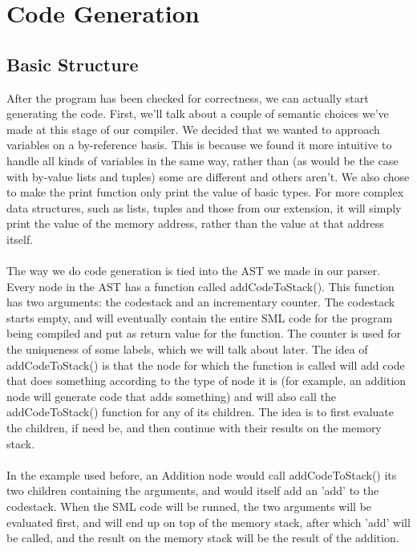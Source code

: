 \documentclass[10pt,a4paper]{article}
\begin{document}


\section{Code Generation}
\subsection{Basic Structure} 
After the program has been checked for correctness, we can actually start generating the code. First, we'll talk about a couple of semantic choices we've made at this stage of our compiler. We decided that we wanted to approach variables on a by-reference basis. This is because we found it more intuitive to handle all kinds of variables in the same way, rather than (as would be the case with by-value lists and tuples) some are different and others aren't. We also chose to make the print function only print the value of basic types. For more complex data structures, such as lists, tuples and those from our extension, it will simply print the value of the memory address, rather than the value at that address itself.\\
\\
The way we do code generation is tied into the AST we made in our parser. Every node in the AST has a function called addCodeToStack(). This function has two arguments: the codestack and an incrementary counter. The codestack starts empty, and will eventually contain the entire SML code for the program being compiled and put as return value for the function. The counter is used for the uniqueness of some labels, which we will talk about later. The idea of addCodeToStack() is that the node for which the function is called will add code that does something according to the type of node it is (for example, an addition node will generate code that adds something) and will also call the addCodeToStack() function for any of its children. The idea is to first evaluate the children, if need be, and then continue with their results on the memory stack. \\
\\
In the example used before, an Addition node would call addCodeToStack() its two children containing the arguments, and would itself add an 'add' to the codestack. When the SML code will be runned, the two arguments will be evaluated first, and will end up on top of the memory stack, after which 'add' will be called, and the result on the memory stack will be the result of the addition.
\end{document}
